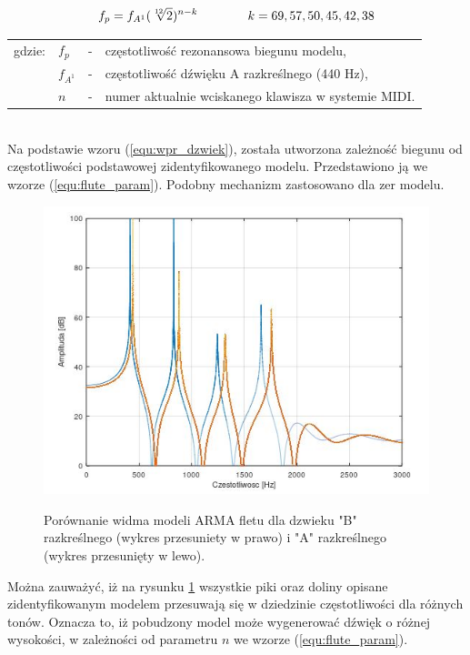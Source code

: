 \begin{equation} \label{equ:flute_param}
\openup\jot
\begin{aligned}[t]
f_{p} = f_{A^{1}}(\sqrt[12]{2})^{n-k} \\ 
\end{aligned}
\qquad\qquad %
\begin{aligned}[t]
k = 69, 57, 50, 45, 42, 38 \\
\end{aligned}
\end{equation}
\begin{tabular}{ l l l l}
	gdzie: & $f_{p}$ &  - & częstotliwość rezonansowa biegunu modelu, \\
	&	$f_{A^{1}}$ & - &  częstotliwość dźwięku A razkreślnego (440 Hz), \\
	&	$n$ & - &  numer aktualnie wciskanego klawisza w systemie MIDI.\\
\end{tabular} \\

Na podstawie wzoru (\ref{equ:wpr_dzwiek}), została utworzona zależność biegunu od częstotliwości podstawowej zidentyfikowanego modelu. Przedstawiono ją we wzorze (\ref{equ:flute_param}). Podobny mechanizm zastosowano dla zer modelu. 

\begin{figure}[H]
	\centering
	\includegraphics[width=11.5cm]{grafiki/Model_B_A}
	\label{rys:por_mod_flet}
	\captionsetup{justification=centering}
	\caption{Porównanie widma modeli ARMA fletu dla dzwieku "B" razkreślnego (wykres przesuniety w prawo) i "A" razkreślnego (wykres przesunięty w lewo).}
	\label{rys:por_mod_flet}
\end{figure}
Można zauważyć, iż na rysunku \ref{rys:por_mod_flet} wszystkie piki oraz doliny opisane zidentyfikowanym modelem przesuwają się w dziedzinie częstotliwości dla różnych tonów. Oznacza to, iż pobudzony model może wygenerować dźwięk o różnej wysokości, w zależności od parametru $n$ we wzorze (\ref{equ:flute_param}).


